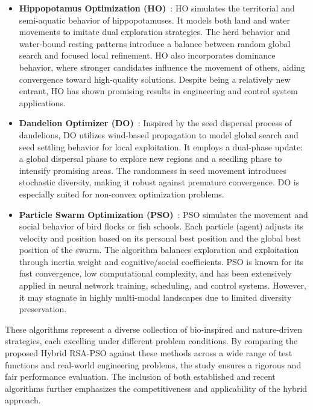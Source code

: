 \documentclass[12pt]{article}
\begin{document}
\begin{itemize}
    \item \textbf{Hippopotamus Optimization (HO)}~\cite{ho_ref}: HO simulates the territorial and semi-aquatic behavior of hippopotamuses. It models both land and water movements to imitate dual exploration strategies. The herd behavior and water-bound resting patterns introduce a balance between random global search and focused local refinement. HO also incorporates dominance behavior, where stronger candidates influence the movement of others, aiding convergence toward high-quality solutions. Despite being a relatively new entrant, HO has shown promising results in engineering and control system applications.

    \item \textbf{Dandelion Optimizer (DO)}~\cite{faramarzi2023dandelion}: Inspired by the seed dispersal process of dandelions, DO utilizes wind-based propagation to model global search and seed settling behavior for local exploitation. It employs a dual-phase update: a global dispersal phase to explore new regions and a seedling phase to intensify promising areas. The randomness in seed movement introduces stochastic diversity, making it robust against premature convergence. DO is especially suited for non-convex optimization problems.

    \item \textbf{Particle Swarm Optimization (PSO)}~\cite{kennedy1995pso}: PSO simulates the movement and social behavior of bird flocks or fish schools. Each particle (agent) adjusts its velocity and position based on its personal best position and the global best position of the swarm. The algorithm balances exploration and exploitation through inertia weight and cognitive/social coefficients. PSO is known for its fast convergence, low computational complexity, and has been extensively applied in neural network training, scheduling, and control systems. However, it may stagnate in highly multi-modal landscapes due to limited diversity preservation.
\end{itemize}

These algorithms represent a diverse collection of bio-inspired and nature-driven strategies, each excelling under different problem conditions. By comparing the proposed Hybrid RSA-PSO against these methods across a wide range of test functions and real-world engineering problems, the study ensures a rigorous and fair performance evaluation. The inclusion of both established and recent algorithms further emphasizes the competitiveness and applicability of the hybrid approach.
\end{document}
